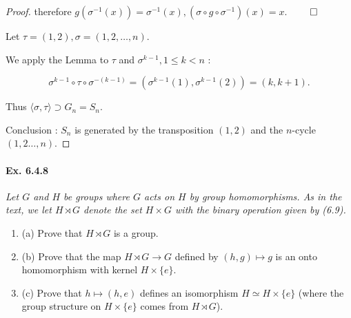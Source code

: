\documentclass[11pt,a4paper]{article}
\newcommand{\be} {\begin{enumerate}}
\newcommand{\ee} {\end{enumerate}}
\begin{document}
\begin{proof}
therefore $g(\sigma^{-1}(x)) = \sigma^{-1}(x), (\sigma \circ g \circ \sigma^{-1})(x) = x$. $\qed$

\bigskip

Let $\tau = (1,2), \sigma = (1,2,\ldots,n)$.

We apply the Lemma to  $ \tau$ and $\sigma^{k-1}, 1 \leq k <n$ :

$$\sigma^{k-1} \circ \tau \circ \sigma^{-(k-1)} = (\sigma^{k-1}(1), \sigma^{k-1}(2)) = (k,k+1).$$

Thus $\langle \sigma, \tau \rangle \supset G_n = S_n$.

Conclusion :  $S_n$ is generated by the transposition $(1, 2)$ and the $n$-cycle $(1, 2 \ldots,n)$.
\end{proof}

\paragraph{Ex. 6.4.8}

{\it Let $G$ and $H$ be groups where $G$ acts on $H$ by group homomorphisms. As in the text, we let $H \rtimes G$ denote the set $H \times G$ with the binary operation given by (6.9).
\be
\item[(a)] Prove that $H \rtimes G$ is a group.
\item[(b)] Prove that the map $H \rtimes G \to G$ defined by $(h,g) \mapsto g$ is an onto homomorphism with kernel $H \times \{e\}$.
\item[(c)] Prove that $h \mapsto (h,e)$ defines an isomorphism $H \simeq H \times \{e\}$ (where the group structure on $H \times \{e\}$ comes from $H \rtimes G$).
\ee
}
\end{document}
